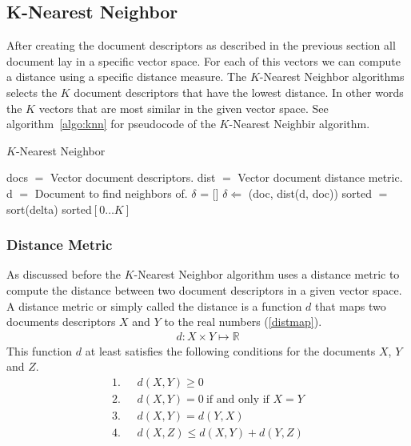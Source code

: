 \subsection{K-Nearest Neighbor}
After creating the document descriptors as described in the previous section
all document lay in a specific vector space. For each of this vectors we
can compute a distance using a specific distance measure. The $K$-Nearest
Neighbor algorithms selects the $K$ document descriptors that have the lowest
distance. In other words the $K$ vectors that are most similar in the given
vector space. See algorithm~\ref{algo:knn} for pseudocode of the $K$-Nearest
Neighbir algorithm.

\begin{algorithm}                      
  \caption{$K$-Nearest Neighbor}      
  \label{algo:knn}
  \begin{algorithmic}

    \STATE docs $=$ Vector document descriptors.
    \STATE dist $=$ Vector document distance metric.
    \STATE d $=$ Document to find neighbors of.
    \STATE $\delta$ = []
      \STATE $\delta \Leftarrow$ (doc, dist(d, doc))
    \ENDFOR
    \STATE sorted $=$ sort(delta)
    \RETURN sorted$[0\ldots K]$
  \end{algorithmic}
\end{algorithm}

\subsubsection{Distance Metric}
As discussed before the $K$-Nearest Neighbor algorithm uses a distance metric
to compute the distance between two document descriptors in a given vector
space. A distance metric or simply called the distance is a function $d$ that 
maps two documents descriptors $X$ and $Y$ to the real numbers (\ref{distmap}).
\begin{align}
  d : X \times Y \mapsto \mathbb{R} \label{distmap}
\end{align}
This function $d$ at least satisfies the following conditions for the documents
$X$, $Y$ and $Z$.
\begin{align*}
  1.\ \ \ & d(X,Y) \geq 0 \\
  2.\ \ \ & d(X,Y) = 0\  \text{if and only if $X=Y$} \\
  3.\ \ \ & d(X,Y) = d(Y,X) \\
  4.\ \ \ & d(X,Z) \leq d(X,Y) + d(Y,Z)
\end{align*}

